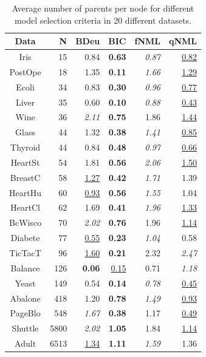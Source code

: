 \begin{table}
  \caption{Average number of parents per node 
    for different model selection criteria in 20 different datasets.}
\label{tbl:nofparams}
\begin{center}
\begin{tabular}{crrrrr}
    Data &     N &              BDeu &               BIC &           fNML &              qNML \\
\midrule
    Iris &    15 &              0.84 &     \textbf{0.63} &  \textit{0.87} &  \underline{0.82} \\
 PostOpe &    18 &              1.35 &     \textbf{0.11} &  \textit{1.66} &  \underline{1.29} \\
   Ecoli &    34 &              0.83 &     \textbf{0.30} &  \textit{0.96} &  \underline{0.77} \\
   Liver &    35 &              0.60 &     \textbf{0.10} &  \textit{0.88} &  \underline{0.43} \\
    Wine &    36 &     \textit{2.11} &     \textbf{0.75} &           1.86 &  \underline{1.44} \\
   Glass &    44 &              1.32 &     \textbf{0.38} &  \textit{1.41} &  \underline{0.85} \\
 Thyroid &    44 &              0.84 &     \textbf{0.48} &  \textit{0.97} &  \underline{0.66} \\
 HeartSt &    54 &              1.81 &     \textbf{0.56} &  \textit{2.06} &  \underline{1.50} \\
 BreastC &    58 &  \underline{1.27} &     \textbf{0.42} &  \textit{1.71} &              1.39 \\
 HeartHu &    60 &  \underline{0.93} &     \textbf{0.56} &  \textit{1.55} &              1.04 \\
 HeartCl &    62 &              1.69 &     \textbf{0.41} &  \textit{1.96} &  \underline{1.33} \\
 BcWisco &    70 &     \textit{2.02} &     \textbf{0.76} &           1.96 &  \underline{1.14} \\
 Diabete &    77 &  \underline{0.55} &     \textbf{0.23} &  \textit{1.04} &              0.58 \\
 TicTacT &    96 &  \underline{1.60} &     \textbf{0.21} &           2.32 &     \textit{2.47} \\
 Balance &   126 &     \textbf{0.06} &  \underline{0.15} &           0.71 &     \textit{1.18} \\
   Yeast &   149 &              0.54 &     \textbf{0.14} &  \textit{0.78} &  \underline{0.45} \\
 Abalone &   418 &              1.20 &     \textbf{0.78} &  \textit{1.49} &  \underline{0.93} \\
 PageBlo &   548 &     \textit{1.67} &     \textbf{0.38} &           1.17 &  \underline{0.49} \\
 Shuttle &  5800 &     \textit{2.02} &     \textbf{1.05} &           1.84 &  \underline{1.14} \\
   Adult &  6513 &  \underline{1.34} &     \textbf{1.11} &  \textit{1.59} &              1.36 \\
\end{tabular}
\end{center}
\end{table}
